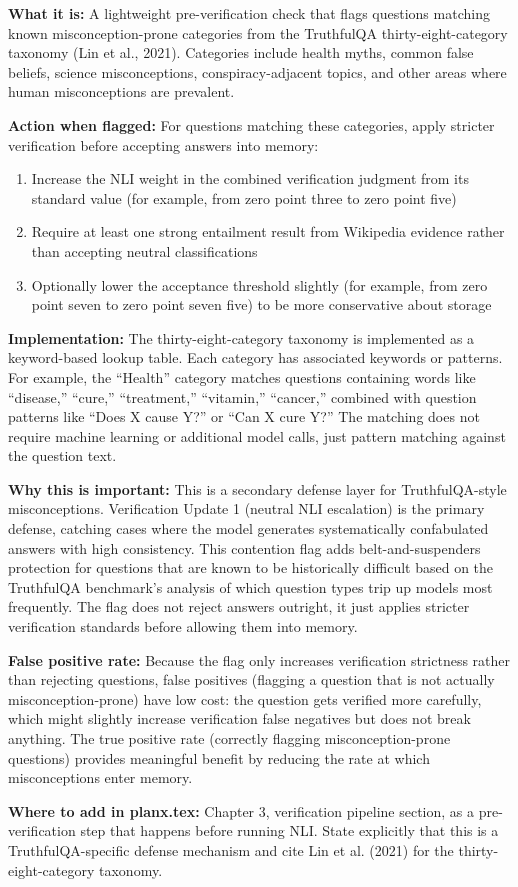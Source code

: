 \documentclass[11pt,a4paper]{article}
\newcommand{\architecturebox}[2]{%
\begin{tcolorbox}[enhanced,breakable,
  colback=LightTeal,colframe=Teal,boxrule=1.5pt,arc=4pt,
  left=8pt,right=8pt,top=6pt,bottom=6pt,
  title={\bfseries\small\color{white}#1},
  attach boxed title to top left={yshift=-2mm,xshift=6mm},
  boxed title style={colback=Teal,arc=3pt,boxrule=0pt,
    left=4pt,right=4pt,top=2pt,bottom=2pt}]
#2
\end{tcolorbox}}
\begin{document}
\architecturebox{VERIFICATION UPDATE 2: TruthfulQA Taxonomy as Pre-Verification Flag}{
\textbf{What it is:} A lightweight pre-verification check that flags questions matching known misconception-prone categories from the TruthfulQA thirty-eight-category taxonomy (Lin et al., 2021). Categories include health myths, common false beliefs, science misconceptions, conspiracy-adjacent topics, and other areas where human misconceptions are prevalent.

\textbf{Action when flagged:} For questions matching these categories, apply stricter verification before accepting answers into memory:
\begin{enumerate}
\item Increase the NLI weight in the combined verification judgment from its standard value (for example, from zero point three to zero point five)
\item Require at least one strong entailment result from Wikipedia evidence rather than accepting neutral classifications
\item Optionally lower the acceptance threshold slightly (for example, from zero point seven to zero point seven five) to be more conservative about storage
\end{enumerate}

\textbf{Implementation:} The thirty-eight-category taxonomy is implemented as a keyword-based lookup table. Each category has associated keywords or patterns. For example, the ``Health'' category matches questions containing words like ``disease,'' ``cure,'' ``treatment,'' ``vitamin,'' ``cancer,'' combined with question patterns like ``Does X cause Y?'' or ``Can X cure Y?'' The matching does not require machine learning or additional model calls, just pattern matching against the question text.

\textbf{Why this is important:} This is a secondary defense layer for TruthfulQA-style misconceptions. Verification Update 1 (neutral NLI escalation) is the primary defense, catching cases where the model generates systematically confabulated answers with high consistency. This contention flag adds belt-and-suspenders protection for questions that are known to be historically difficult based on the TruthfulQA benchmark's analysis of which question types trip up models most frequently. The flag does not reject answers outright, it just applies stricter verification standards before allowing them into memory.

\textbf{False positive rate:} Because the flag only increases verification strictness rather than rejecting questions, false positives (flagging a question that is not actually misconception-prone) have low cost: the question gets verified more carefully, which might slightly increase verification false negatives but does not break anything. The true positive rate (correctly flagging misconception-prone questions) provides meaningful benefit by reducing the rate at which misconceptions enter memory.

\textbf{Where to add in planx.tex:} Chapter 3, verification pipeline section, as a pre-verification step that happens before running NLI. State explicitly that this is a TruthfulQA-specific defense mechanism and cite Lin et al. (2021) for the thirty-eight-category taxonomy.
}
\end{document}
